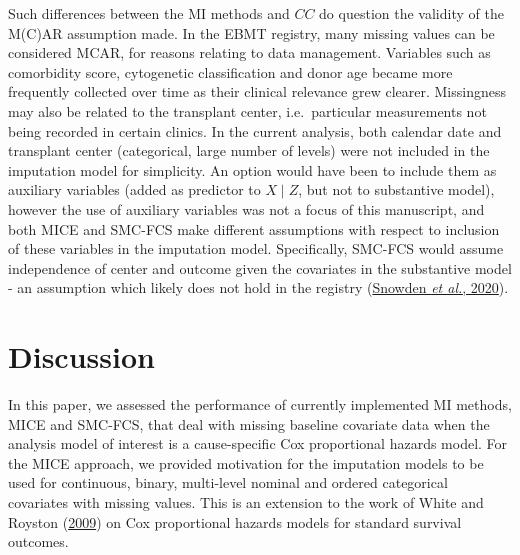 \documentclass[
  letterpaper,
  DIV=11,
  numbers=noendperiod]{scrreprt}
\begin{document}
Such differences between the MI methods and \(CC\) do question the
validity of the M(C)AR assumption made. In the EBMT registry, many
missing values can be considered MCAR, for reasons relating to data
management. Variables such as comorbidity score, cytogenetic
classification and donor age became more frequently collected over time
as their clinical relevance grew clearer. Missingness may also be
related to the transplant center, i.e.~particular measurements not being
recorded in certain clinics. In the current analysis, both calendar date
and transplant center (categorical, large number of levels) were not
included in the imputation model for simplicity. An option would have
been to include them as auxiliary variables (added as predictor to
\(X \mid Z\), but not to substantive model), however the use of
auxiliary variables was not a focus of this manuscript, and both MICE
and SMC-FCS make different assumptions with respect to inclusion of
these variables in the imputation model. Specifically, SMC-FCS would
assume independence of center and outcome given the covariates in the
substantive model - an assumption which likely does not hold in the
registry
(\protect\hyperlink{ref-snowdenBenchmarkingSurvivalOutcomes2020}{Snowden
\emph{et al.}, 2020}).

\hypertarget{sec-cs-MI-discussion}{%
\section{Discussion}\label{sec-cs-MI-discussion}}

In this paper, we assessed the performance of currently implemented MI
methods, MICE and SMC-FCS, that deal with missing baseline covariate
data when the analysis model of interest is a cause-specific Cox
proportional hazards model. For the MICE approach, we provided
motivation for the imputation models to be used for continuous, binary,
multi-level nominal and ordered categorical covariates with missing
values. This is an extension to the work of White and Royston
(\protect\hyperlink{ref-whiteImputingMissingCovariate2009}{2009}) on Cox
proportional hazards models for standard survival outcomes.
\end{document}
